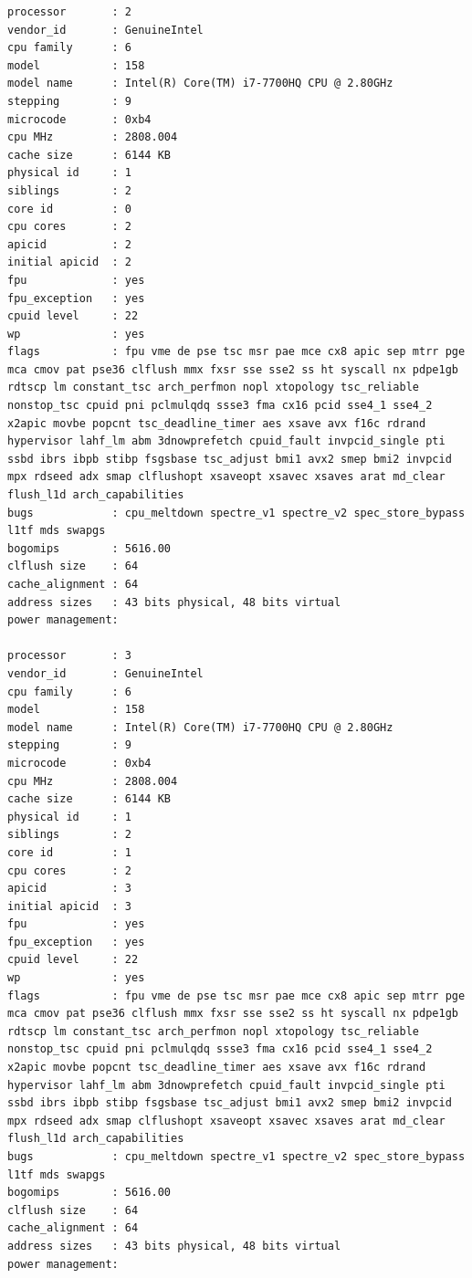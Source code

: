 \documentclass[blue,normal,cn]{elegantnote}
\begin{document}
\begin{lstlisting}
processor       : 2
vendor_id       : GenuineIntel
cpu family      : 6
model           : 158
model name      : Intel(R) Core(TM) i7-7700HQ CPU @ 2.80GHz
stepping        : 9
microcode       : 0xb4
cpu MHz         : 2808.004
cache size      : 6144 KB
physical id     : 1
siblings        : 2
core id         : 0
cpu cores       : 2
apicid          : 2
initial apicid  : 2
fpu             : yes
fpu_exception   : yes
cpuid level     : 22
wp              : yes
flags           : fpu vme de pse tsc msr pae mce cx8 apic sep mtrr pge mca cmov pat pse36 clflush mmx fxsr sse sse2 ss ht syscall nx pdpe1gb rdtscp lm constant_tsc arch_perfmon nopl xtopology tsc_reliable nonstop_tsc cpuid pni pclmulqdq ssse3 fma cx16 pcid sse4_1 sse4_2 x2apic movbe popcnt tsc_deadline_timer aes xsave avx f16c rdrand hypervisor lahf_lm abm 3dnowprefetch cpuid_fault invpcid_single pti ssbd ibrs ibpb stibp fsgsbase tsc_adjust bmi1 avx2 smep bmi2 invpcid mpx rdseed adx smap clflushopt xsaveopt xsavec xsaves arat md_clear flush_l1d arch_capabilities
bugs            : cpu_meltdown spectre_v1 spectre_v2 spec_store_bypass l1tf mds swapgs
bogomips        : 5616.00
clflush size    : 64
cache_alignment : 64
address sizes   : 43 bits physical, 48 bits virtual
power management:

processor       : 3
vendor_id       : GenuineIntel
cpu family      : 6
model           : 158
model name      : Intel(R) Core(TM) i7-7700HQ CPU @ 2.80GHz
stepping        : 9
microcode       : 0xb4
cpu MHz         : 2808.004
cache size      : 6144 KB
physical id     : 1
siblings        : 2
core id         : 1
cpu cores       : 2
apicid          : 3
initial apicid  : 3
fpu             : yes
fpu_exception   : yes
cpuid level     : 22
wp              : yes
flags           : fpu vme de pse tsc msr pae mce cx8 apic sep mtrr pge mca cmov pat pse36 clflush mmx fxsr sse sse2 ss ht syscall nx pdpe1gb rdtscp lm constant_tsc arch_perfmon nopl xtopology tsc_reliable nonstop_tsc cpuid pni pclmulqdq ssse3 fma cx16 pcid sse4_1 sse4_2 x2apic movbe popcnt tsc_deadline_timer aes xsave avx f16c rdrand hypervisor lahf_lm abm 3dnowprefetch cpuid_fault invpcid_single pti ssbd ibrs ibpb stibp fsgsbase tsc_adjust bmi1 avx2 smep bmi2 invpcid mpx rdseed adx smap clflushopt xsaveopt xsavec xsaves arat md_clear flush_l1d arch_capabilities
bugs            : cpu_meltdown spectre_v1 spectre_v2 spec_store_bypass l1tf mds swapgs
bogomips        : 5616.00
clflush size    : 64
cache_alignment : 64
address sizes   : 43 bits physical, 48 bits virtual
power management:


\end{lstlisting}
\end{document}
